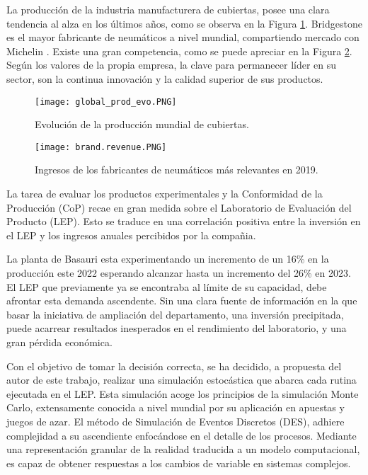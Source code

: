 \documentclass[12pt]{article}
\begin{document}
La producción de la industria manufacturera de cubiertas, posee una clara tendencia al alza en los últimos años, como se observa en la Figura \ref{fig:global_prod_evo}. Bridgestone es el mayor fabricante de neumáticos a nivel mundial, compartiendo mercado con Michelin \citep{rodgers2020tire}.  Existe una gran competencia, como se puede apreciar en la Figura \ref{fig:brand_revenue}. Según los valores de la propia empresa, la clave para permanecer líder en su sector, son la continua innovación y la calidad superior de sus productos.

\begin{figure}[h]
    \begin{center}
        \texttt{[image: global\_prod\_evo.PNG]}    
    \end{center}
    \caption{Evolución de la producción mundial de cubiertas.}
    \label{fig:global_prod_evo}
\end{figure}

\begin{figure}[h]
    \begin{center}
        \texttt{[image: brand.revenue.PNG]}    
    \end{center}
    \caption{Ingresos de los fabricantes de neumáticos más relevantes en 2019.}
    \label{fig:brand_revenue}
\end{figure}

La tarea de evaluar los productos experimentales y la Conformidad de la Producción (CoP) recae en gran medida sobre el Laboratorio de Evaluación del Producto (LEP). Esto se traduce en una correlación positiva entre la inversión en el LEP y los ingresos anuales percibidos por la compañia.

La planta de Basauri esta experimentando un incremento de un 16\% en la producción este 2022 esperando alcanzar hasta un incremento del 26\% en 2023. El LEP que previamente ya se encontraba al límite de su capacidad, debe afrontar esta demanda ascendente. Sin una clara fuente de información en la que basar la iniciativa de ampliación del departamento, una inversión precipitada, puede acarrear resultados inesperados en el rendimiento del laboratorio, y una gran pérdida económica.

Con el objetivo de tomar la decisión correcta, se ha decidido, a propuesta del autor de este trabajo, realizar una simulación estocástica que abarca cada rutina ejecutada en el LEP. Esta simulación acoge los principios de la simulación Monte Carlo, extensamente conocida a nivel mundial por su aplicación en apuestas y juegos de azar. El método de Simulación de Eventos Discretos (DES), adhiere complejidad a su ascendiente enfocándose en el detalle de los procesos. Mediante una representación  granular de la realidad traducida a un modelo computacional, es capaz de obtener respuestas a los cambios de variable en sistemas complejos.
 
\end{document}
